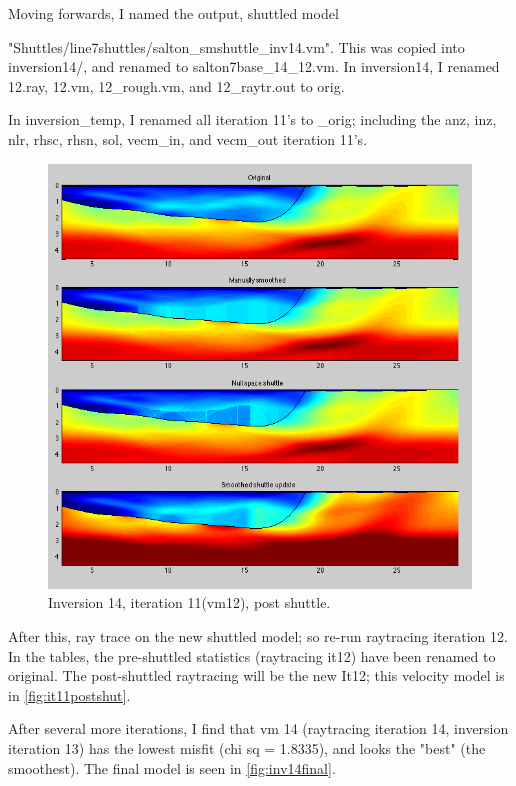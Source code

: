 \documentclass[fontsize=11pt, %
                             paper=a4, %
                             twoside, %
                             captions=tableheading,
                             index=totoc,
                             hyperref]{labbook}
\begin{document}
\begin{addmargin}[4cm]{0cm}
Moving forwards, I named the output, shuttled model 

"Shuttles/line7shuttles/salton\_smshuttle\_inv14.vm".  This was copied into inversion14/, and renamed to salton7base\_14\_12.vm.
In inversion14, I renamed 12.ray, 12.vm, 12\_rough.vm, and 12\_raytr.out to orig.

In inversion\_temp, I renamed all iteration 11's to \_orig; including the anz, inz, nlr, rhsc, rhsn, sol, vecm\_in, and vecm\_out iteration 11's.  

\begin{figure}[h!]
\raggedleft
\includegraphics[scale=0.6,keepaspectratio=true]{figs/shuttlesInv14.png}
\caption{Inversion 14, iteration 11(vm12), post shuttle.}
\label{fig:it11postshut}
\end{figure}

After this, ray trace on the new shuttled model; so re-run raytracing iteration 12.  In the tables, the pre-shuttled statistics (raytracing it12) have been renamed to original.  The post-shuttled raytracing will be the new It12; this velocity model is in \autoref{fig:it11postshut}.

After several more iterations, I find that vm 14 (raytracing iteration 14, inversion iteration 13) has the lowest misfit (chi sq = 1.8335), and looks the "best" (the smoothest).  The final model is seen in \autoref{fig:inv14final}.  



\end{addmargin}
\end{document}
